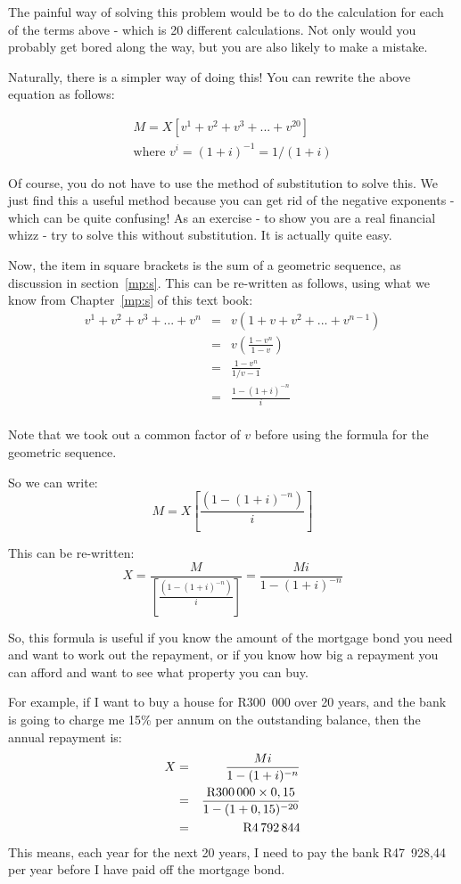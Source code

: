 The painful way of solving this problem would be to do the calculation for each of the terms above - which is 20 different calculations. Not only would you probably get bored along the way, but you are also likely to make a mistake.

Naturally, there is a simpler way of doing this! You can rewrite the above equation as follows:

\begin{eqnarray*}
M = X[v^1 + v^2 + v^3 + ... + v^{20}]\\
\mbox{where $v^i = (1+i)^{-1} = 1/(1+i)$}
\end{eqnarray*}

Of course, you do not have to use the method of substitution to solve this. We just find this a useful method because you can get rid of the negative exponents - which can be quite confusing! As an exercise - to show you are a real financial whizz - try to solve this without substitution. It is actually quite easy.

Now, the item in square brackets is the sum of a geometric sequence, as discussion in section~\ref{mp:s}. This can be re-written as follows, using what we know from Chapter~\ref{mp:s} of this text book:
\begin{eqnarray*}
v^1 + v^2 + v^3 + ... + v^n &=& v(1 + v + v^2 + ... + v^{n-1})\\
&=& v(\frac{1 - v^n}{1-v})\\
&=& \frac{1 - v^n}{1/v-1}\\
&=& \frac{1-(1+i)^{-n}}{i}\\
\end{eqnarray*}

Note that we took out a common factor of $v$ before using the formula for the geometric sequence.

So we can write:
\begin{equation*}
M = X[\frac{(1-(1+i)^{-n})}{i}]
\end{equation*}

This can be re-written:
\begin{equation*}
X = \frac{M}{[\frac{(1-(1+i)^{-n})}{i}]} = \frac{Mi}{1-(1+i)^{-n}}
\end{equation*}

So, this formula is useful if you know the amount of the mortgage bond you need and want to work out the repayment, or if you know how big a repayment you can afford and want to see what property you can buy.

For example, if I want to buy a house for R300~000 over 20 years, and the bank is going to charge me 15\% per annum on the outstanding balance, then the annual repayment is:
\begin{eqnarray*}
X &=& \frac{Mi}{1-(1+i)^{-n}}\\
&=& \frac{\rm{R}300\,000 \times 0,15}{1-(1+0,15)^{-20}}\\
&=& \rm{R}4\,792\,844
\end{eqnarray*}
This means, each year for the next 20 years, I need to pay the bank R47~928,44 per year before I have paid off the mortgage bond. 


